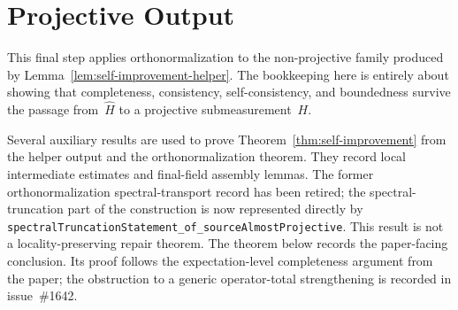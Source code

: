 \section{Projective Output}
\label{sec:self-improvement-projective}

This final step applies orthonormalization to the non-projective family produced by
Lemma~\ref{lem:self-improvement-helper}. The bookkeeping here is entirely about
showing that completeness, consistency, self-consistency, and boundedness survive
the passage from~$\widehat H$ to a projective submeasurement~$H$.

\begin{remark}\label{rem:self-improvement-lean-interfaces}
  Several auxiliary results are used to prove Theorem~\ref{thm:self-improvement}
  from the helper output and the orthonormalization theorem.  They record
  local intermediate estimates and final-field assembly lemmas.  The
  former orthonormalization spectral-transport record has been retired; the
  spectral-truncation part of the construction is now represented directly by
  \texttt{spectralTruncationStatement\_of\_sourceAlmostProjective}.  This result is
  not a locality-preserving repair theorem.  The theorem below records the
  paper-facing conclusion.  Its proof follows the expectation-level completeness
  argument from the paper; the obstruction to a generic operator-total
  strengthening is recorded in issue~\#1642.
\end{remark}

